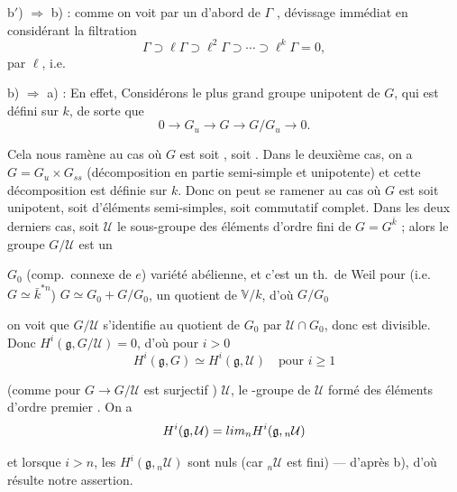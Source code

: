 \documentclass[11pt,a4paper]{article}
\begin{document}
b$'$) $\Rightarrow$ b) : \struck{\ill{}} comme on voit par un
  d'abord de $\Gamma$ \struck{\ill{}}
, dévissage immédiat en considérant la filtration
\[
\Gamma \supset \ell\Gamma \supset \ell^{2}\Gamma \supset \cdots
\supset \ell^{k}\Gamma = 0 ,
\]
\ill{} par $\ell$, i.e. \ill{} \struck{\ill{}}

b) $\Rightarrow$ a) : En effet,  \ill{} Considérons
\ill{} le plus grand \ill{} groupe unipotent de $G$, qui est défini sur
$k$, \ill{} de sorte que
\[
0 \to G_{u} \to G \to G/G_{u} \to 0 .
\]

Cela nous ramène au cas où $G$ est soit , soit
. Dans le deuxième \struck{\ill{}} cas,
\struck{\ill{}} on a $G = G_{u} \times G_{ss}$ (décomposition en partie
semi-simple et unipotente) et cette décomposition est définie sur $k$. Donc
on peut se ramener au cas où $G$ est soit unipotent, soit
 \ill{} d'éléments semi-simples, soit commutatif
\ill{} complet. Dans les deux derniers cas, soit $\mathcal{U}$ \ill{} le
sous-groupe des éléments d'ordre fini de $G = G^{\bar{k}}$ ; alors le
groupe $G/\mathcal{U}$ est un \ill{}


\ill{} $G_{0}$ (comp.\ connexe de $e$) \ill{} variété abélienne, et c'est
un th.\ de Weil pour \ill{} (i.e. $G \simeq \bar{k}^{*n}$) \ill{}
\struck{\ill{}} $G \simeq G_{0} + G/G_{0}$, \ill{} un quotient de
$\mathbb{V}/k$, d'où \ill{} $G/G_{0}$ \ill{}

\ill{} on voit que $G/\mathcal{U}$ s'identifie au quotient de $G_{0}$ par
$\mathcal{U} \cap G_{0}$, donc \ill{} est divisible. Donc
$H^{i}(\mathfrak{g}, G/\mathcal{U}) = 0$,  d'où pour
$i > 0$
\[
H^{i}(\mathfrak{g}, G) \simeq H^{i}(\mathfrak{g}, \mathcal{U})
\quad \text{pour } i \geq 1
\]

(comme \ill{} pour $G \to G/\mathcal{U}$ est surjectif \ill{}) \ill{}
$\mathcal{U}$, le \ill{}-groupe de $\mathcal{U}$ formé des éléments
d'ordre premier \ill{}. On a
\[
H^{i}(\mathfrak{g}, \mathcal{U}) = \varinjlim_{n}
H^{i}(\mathfrak{g}, {}_{n}\mathcal{U})
\]

et lorsque $i > n$, les  $H^{i}(\mathfrak{g},
{}_{n}\mathcal{U})$ sont nuls (car ${}_{n}\mathcal{U}$ est fini) ---
d'après b), d'où résulte notre assertion.
\end{document}
